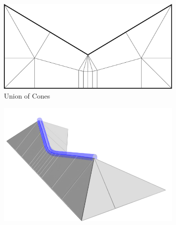 \begin{figure}
\begin{subfigure}{\figwidth}
\includegraphics[width=\figwidthTwo]{sources/method/surface/uoc.pdf}
\caption{Union of Cones}\label{3d_surface_overview_uoc}
\end{subfigure}
\begin{subfigure}{\figwidth}\centering
\hspace*{\tempheightTwo}
\includegraphics[width=\figwidthTree]{sources/method/surface/marking_cropped.png}

\vspace{\tempheight}


\end{subfigure}
\end{figure}
